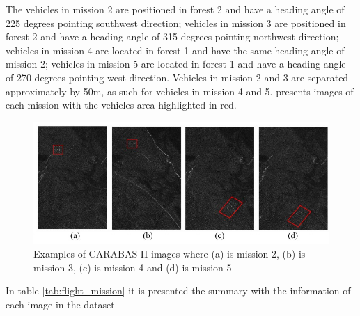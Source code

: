 The vehicles in mission 2 are positioned in forest 2 and have a heading angle of 225 degrees pointing southwest direction;
vehicles in mission 3 are positioned in forest 2 and have a heading angle of 315 degrees pointing northwest direction;
vehicles in mission 4 are located in forest 1 and have the same heading angle of mission 2;
vehicles in mission 5 are located in forest 1 and have a heading angle of 270 degrees pointing west direction.
Vehicles in mission 2 and 3 are separated approximately by 50m, as such for vehicles in mission 4 and 5.
 presents images of each mission with the vehicles area highlighted in red.

\begin{figure}[h]
    \centering
    \includegraphics{chapter6/carabas_vehicles.jpg}
    \caption{Examples of CARABAS-II images where (a) is mission 2, (b) is mission 3, (c) is mission 4 and (d)
    is mission 5}
    \label{fig:carabas_vehicles}
\end{figure}

In table \ref{tab:flight_mission} it is presented the summary with the information of each image in the dataset

